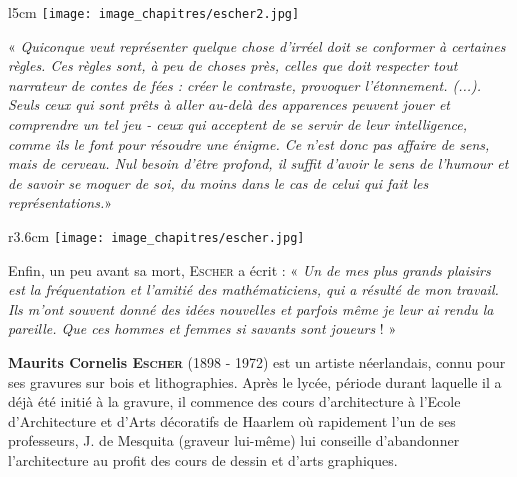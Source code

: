 
\begin{His}

{}

\vspace{0.4cm}

\begin{wrapfigure}[11]{l}{5cm}
\vspace{-7mm}
\texttt{[image: image\_chapitres/escher2.jpg]} 
\end{wrapfigure}
« \textit{Quiconque  veut  représenter  quelque  chose  d'irréel  doit  se  conformer à  certaines  règles.  Ces  règles  sont,  à  peu de choses près,  celles que doit respecter  tout  narrateur  de contes de  fées  : créer le contraste, provoquer l'étonnement. (...). Seuls  ceux  qui  sont  prêts  à  aller  au-delà  des  apparences  peuvent  jouer  et  comprendre  un  tel  jeu  - ceux  qui acceptent de se servir de leur intelligence, comme ils le font pour résoudre une énigme. Ce n'est donc pas affaire de sens, mais de cerveau.  Nul besoin  d'être profond, il suffit  d'avoir le  sens de l'humour et de  savoir  se moquer de soi, du moins dans le cas de celui qui fait les représentations.}» 

\vspace{0.4cm}
\begin{wrapfigure}[4]{r}{3.6cm}
\vspace{-7mm}
\texttt{[image: image\_chapitres/escher.jpg]} 
\end{wrapfigure}

Enfin, un peu avant sa mort, \textsc{Escher} a écrit : « \textit{Un de mes plus grands plaisirs est la fréquentation et l'amitié des mathématiciens, qui a résulté de mon travail. Ils m'ont souvent donné des idées nouvelles et parfois même je leur ai rendu la pareille. Que ces hommes et femmes si savants sont joueurs} ! » 



\textbf{Maurits  Cornelis  \textsc{Escher}} (1898 - 1972)  est  un  artiste  néerlandais,  connu  pour  ses  gravures  sur  bois  et lithographies. Après le lycée, période durant laquelle il a déjà été initié à la gravure, il commence des cours d’architecture à l’Ecole d’Architecture  et  d’Arts  décoratifs de Haarlem où rapidement  l’un  de  ses professeurs, J. de Mesquita (graveur lui-même) lui conseille d’abandonner l’architecture au profit des cours de dessin et d’arts graphiques. 


\end{His}
